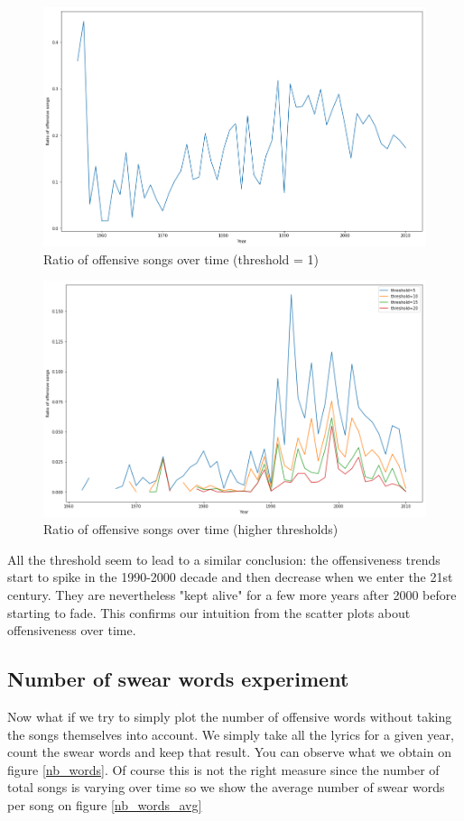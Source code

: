 \documentclass[11pt]{article}
\begin{document}
\begin{figure}
\centering
\includegraphics[width=\textwidth]{plots/ratio_time}
\caption{Ratio of offensive songs over time (threshold = 1)}
\label{ratio_time}
\end{figure}

\begin{figure}
\centering
\includegraphics[width=\textwidth]{plots/ratio_time_threshold}
\caption{Ratio of offensive songs over time (higher thresholds)}
\label{ratio_time_threshold}
\end{figure}

All the threshold seem to lead to a similar conclusion: the offensiveness trends start to spike in the 1990-2000 decade and then decrease when we enter the 21st century. They are nevertheless "kept alive" for a few more years after 2000 before starting to fade. This confirms our intuition from the scatter plots about offensiveness over time.

\subsection{Number of swear words experiment}
Now what if we try to simply plot the number of offensive words without taking the songs themselves into account. We simply take all the lyrics for a given year, count the swear words and keep that result. You can observe what we obtain on figure \ref{nb_words}. Of course this is not the right measure since the number of total songs is varying over time so we show the average number of swear words per song on figure \ref{nb_words_avg}
\end{document}
